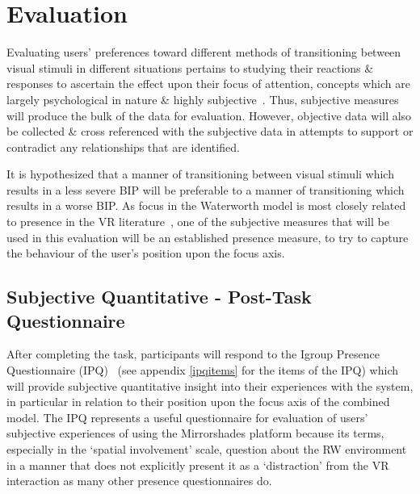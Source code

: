 \documentclass[oneside]{book}
\begin{document}

\section{Evaluation}


Evaluating users' preferences toward different methods of transitioning between visual stimuli in different situations pertains to studying their reactions \& responses to ascertain the effect upon their focus of attention, concepts which are largely psychological in nature \& highly subjective~\cite{Ijsselsteijn2001}. Thus, subjective measures will produce the bulk of the data for evaluation. However, objective data will also be collected \& cross referenced with the subjective data in attempts to support or contradict any relationships that are identified.

It is hypothesized that a manner of transitioning between visual stimuli which results in a less severe BIP will be preferable to a manner of transitioning which results in a worse BIP. As focus in the Waterworth model is most closely related to presence in the VR literature~\cite{Waterworth2001}, one of the subjective measures that will be used in this evaluation will be an established presence measure, to try to capture the behaviour of the user's position upon the focus axis.

\subsection{Subjective Quantitative - Post-Task Questionnaire}
After completing the task, participants will respond to the Igroup Presence Questionnaire (IPQ)~\cite{Schubert2001} (see appendix \ref{ipqitems} for the items of the IPQ) which will provide subjective quantitative insight into their experiences with the system, in particular in relation to their position upon the focus axis of the combined model. The IPQ represents a useful questionnaire for evaluation of users' subjective experiences of using the Mirrorshades platform because its terms, especially in the `spatial involvement' scale, question about the RW environment in a manner that does not explicitly present it as a `distraction' from the VR interaction as many other presence questionnaires do.
\end{document}
